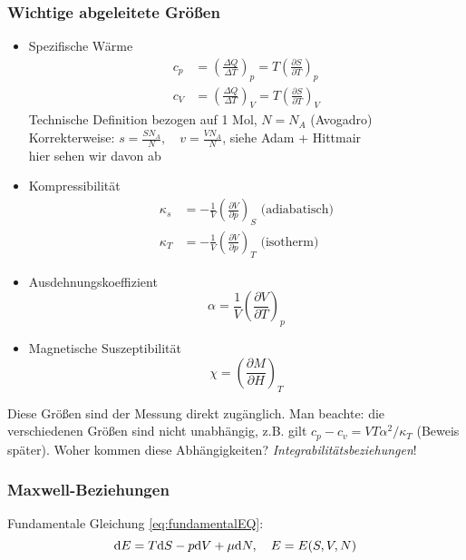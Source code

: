 \subsubsection{Wichtige abgeleitete Größen}
\begin{itemize}
    \item Spezifische Wärme
    \begin{equation}
        \begin{split}
            c_p &= \left( \frac{\Delta Q}{\Delta T} \right)_p = T \left( \frac{\partial S}{\partial T} \right)_p \\
            c_V &= \left( \frac{\Delta Q}{\Delta T} \right)_V = T \left( \frac{\partial S}{\partial T} \right)_V
        \end{split}
    \end{equation}
    Technische Definition bezogen auf 1 Mol, $N=N_A$ (Avogadro) \\
    Korrekterweise: $s = \frac{S N_A}{N}, \quad v = \frac{V N_A}{N}$, siehe Adam + Hittmair \\
    hier sehen wir davon ab
    \item Kompressibilität
    \begin{equation}
        \begin{split}
            \kappa_s &= - \frac{1}{V} \left( \frac{\partial V}{\partial p} \right)_S \text{ (adiabatisch)} \\
            \kappa_T &= - \frac{1}{V} \left( \frac{\partial V}{\partial p} \right)_T \text{ (isotherm)}
        \end{split}
    \end{equation}
    \item Ausdehnungskoeffizient
    \begin{equation}
        \alpha = \frac{1}{V} \left( \frac{\partial V}{\partial T} \right)_p
    \end{equation}
    \item Magnetische Suszeptibilität
    \begin{equation}
        \chi = \left( \frac{\partial M}{\partial H} \right)_T
    \end{equation}
\end{itemize}
Diese Größen sind der Messung direkt zugänglich. Man beachte: die verschiedenen Größen sind nicht unabhängig, z.B. gilt
$c_p - c_v = V T \alpha^2 / \kappa_T$ (Beweis später).
Woher kommen diese Abhängigkeiten? \emph{Integrabilitätsbeziehungen}!
\subsubsection{Maxwell-Beziehungen}
Fundamentale Gleichung \eqref{eq:fundamentalEQ}:
\begin{equation}
    \mathrm{d} E = T \mathrm{d} S - p \mathrm{d} V + \mu \mathrm{d} N, \quad E=E(S, V, N)
\end{equation}
